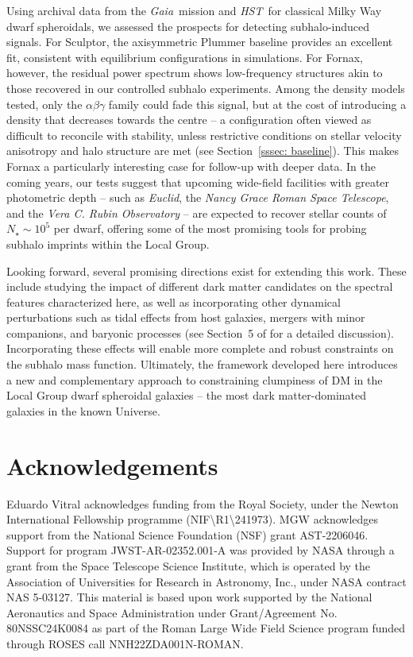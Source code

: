 \documentclass[fleqn,usenatbib]{mnras}
\newcommand{\gaia}{{\sl Gaia}}
\newcommand{\hst}{{\sl HST}}
\begin{document}
Using archival data from the \gaia\ mission and \hst\ for classical Milky Way dwarf spheroidals, we assessed the prospects for detecting subhalo-induced signals. For Sculptor, the axisymmetric Plummer baseline provides an excellent fit, consistent with equilibrium configurations in simulations. For Fornax, however, the residual power spectrum shows low-frequency structures akin to those recovered in our controlled subhalo experiments. Among the density models tested, only the $\alpha\beta\gamma$ family could fade this signal, but at the cost of introducing a density that decreases towards the centre -- a configuration often viewed as difficult to reconcile with stability, unless restrictive conditions on stellar velocity anisotropy and halo structure are met (see Section~\ref{sssec: baseline}). This makes Fornax a particularly interesting case for follow-up with deeper data. In the coming years, our tests suggest that upcoming wide-field facilities with greater photometric depth -- such as \textit{Euclid}, the \textit{Nancy Grace Roman Space Telescope}, and the \textit{Vera C. Rubin Observatory} -- are expected to recover stellar counts of $N_{\star} \sim 10^{5}$ per dwarf, offering some of the most promising tools for probing subhalo imprints within the Local Group.

Looking forward, several promising directions exist for extending this work. These include studying the impact of different dark matter candidates on the spectral features characterized here, as well as incorporating other dynamical perturbations such as tidal effects from host galaxies, mergers with minor companions, and baryonic processes (see Section~5 of \citealt{Penarrubia+25} for a detailed discussion). Incorporating these effects will enable more complete and robust constraints on the subhalo mass function. Ultimately, the framework developed here introduces a new and complementary approach to constraining clumpiness of DM in the Local Group dwarf spheroidal galaxies -- the most dark matter-dominated galaxies in the known Universe.

\section*{Acknowledgements}

Eduardo Vitral acknowledges funding from the Royal Society, under the Newton International Fellowship programme (NIF\textbackslash R1\textbackslash 241973).
MGW acknowledges support from the National Science Foundation (NSF) grant AST-2206046. Support for program JWST-AR-02352.001-A was provided by NASA through a grant from the Space Telescope Science Institute, which is operated by the Association of Universities for Research in Astronomy, Inc., under NASA contract NAS 5-03127. This material is based upon work supported by the National Aeronautics and Space Administration under Grant/Agreement No. 80NSSC24K0084 as part of the Roman Large Wide Field Science program funded through ROSES call NNH22ZDA001N-ROMAN.
\end{document}
